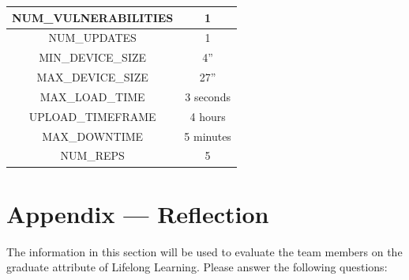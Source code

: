 \documentclass[12pt]{article}
\begin{document}
\begin{table}[H]
\begin{tabular}{|c|c|}
      \hline
      NUM\_VULNERABILITIES & 1 \\
      \hline
      NUM\_UPDATES & 1 \\
      \hline
      MIN\_DEVICE\_SIZE & 4'' \\
      \hline
      MAX\_DEVICE\_SIZE & 27'' \\
      \hline
      MAX\_LOAD\_TIME & 3 seconds \\
      \hline
      UPLOAD\_TIMEFRAME & 4 hours \\
      \hline
      MAX\_DOWNTIME & 5 minutes \\
      \hline
      NUM\_REPS & 5 \\
      \hline
  \end{tabular}
\end{table}

\newpage

\section*{Appendix --- Reflection}

The information in this section will be used to evaluate the team members on the
graduate attribute of Lifelong Learning.  Please answer the following questions:
\end{document}
